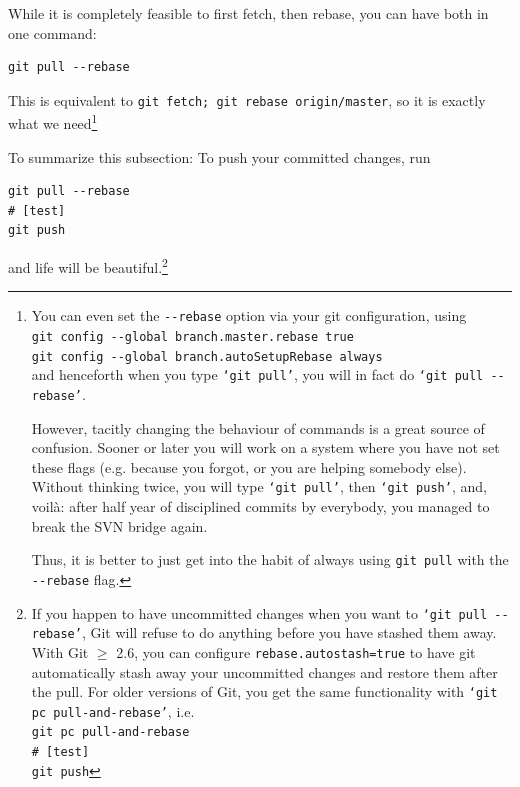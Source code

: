 \documentclass[12pt,pdftex]{article}
\begin{document}
While it is completely feasible to first fetch, then rebase, you can
have both in one command:
\lstset{frame=single,basicstyle=\ttfamily\footnotesize,language=sh,label= ,caption= ,captionpos=b,numbers=none}
\begin{lstlisting}
git pull --rebase
\end{lstlisting}
This is equivalent to \verb~git fetch; git rebase origin/master~, so it is
exactly what we need\footnote{You can even set the \texttt{-{}-rebase} option via your git configuration,
using\\
\noindent\qquad\qquad  \texttt{git config -{}-global branch.master.rebase true}\\
\noindent\qquad\qquad  \texttt{git config -{}-global branch.autoSetupRebase always}\\
and henceforth when you type \texttt{‘git pull’}, you will in fact do
\texttt{‘git pull -{}-rebase’}.

However, tacitly changing the behaviour of commands is a great source of
confusion.
Sooner or later you will work on a system where you have not set these
flags (e.g. because you forgot, or you are helping somebody else).
Without thinking twice, you will type \texttt{‘git pull’}, then \texttt{‘git push’},
and, voilà: after half year of disciplined commits by everybody, you
managed to break the SVN bridge again.

Thus, it is better to just get into the habit of always using \texttt{git pull}
with the \texttt{-{}-rebase} flag.}

\bigskip

To summarize this subsection:
To push your committed changes, run
\lstset{frame=single,basicstyle=\ttfamily\footnotesize,language=sh,label= ,caption= ,captionpos=b,numbers=none}
\begin{lstlisting}
git pull --rebase
# [test]
git push
\end{lstlisting}
and life will be beautiful.\footnote{If you happen to have uncommitted changes when you want to
\texttt{‘git pull -{}-rebase’}, Git will refuse to do anything before you have
stashed them away.
With Git \(\ge\) 2.6, you can configure \verb~rebase.autostash=true~ to have git
automatically stash away your uncommitted changes and restore them after
the pull.
For older versions of Git, you get the same functionality with
\texttt{‘git pc pull-and-rebase’}, i.e.\\
\noindent\qquad\qquad  \texttt{git pc pull-and-rebase}\\
\noindent\qquad\qquad  \texttt{\# [test]}\\
\noindent\qquad\qquad  \texttt{git push}}
\end{document}
